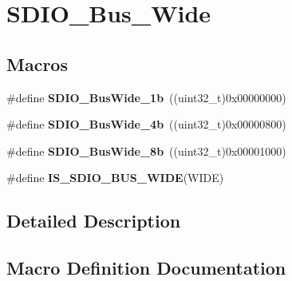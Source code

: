 \hypertarget{group___s_d_i_o___bus___wide}{}\section{S\+D\+I\+O\+\_\+\+Bus\+\_\+\+Wide}
\label{group___s_d_i_o___bus___wide}
\subsection*{Macros}
\begin{DoxyCompactItemize}
\item 
\hypertarget{group___s_d_i_o___bus___wide_ga9c333b57937c5cc0a173a58519f9250a}{}\#define {\bfseries S\+D\+I\+O\+\_\+\+Bus\+Wide\+\_\+1b}~((uint32\+\_\+t)0x00000000)\label{group___s_d_i_o___bus___wide_ga9c333b57937c5cc0a173a58519f9250a}

\item 
\hypertarget{group___s_d_i_o___bus___wide_ga79815d1d798b28a2d3750ad25466ff1b}{}\#define {\bfseries S\+D\+I\+O\+\_\+\+Bus\+Wide\+\_\+4b}~((uint32\+\_\+t)0x00000800)\label{group___s_d_i_o___bus___wide_ga79815d1d798b28a2d3750ad25466ff1b}

\item 
\hypertarget{group___s_d_i_o___bus___wide_ga4d864f5c4e1af298146afc1d680081e9}{}\#define {\bfseries S\+D\+I\+O\+\_\+\+Bus\+Wide\+\_\+8b}~((uint32\+\_\+t)0x00001000)\label{group___s_d_i_o___bus___wide_ga4d864f5c4e1af298146afc1d680081e9}

\item 
\#define {\bfseries I\+S\+\_\+\+S\+D\+I\+O\+\_\+\+B\+U\+S\+\_\+\+W\+I\+D\+E}(W\+I\+D\+E)
\end{DoxyCompactItemize}


\subsection{Detailed Description}


\subsection{Macro Definition Documentation}
\hypertarget{group___s_d_i_o___bus___wide_gaa5c6ad922117d5df3213631bf68fde5b}{}
